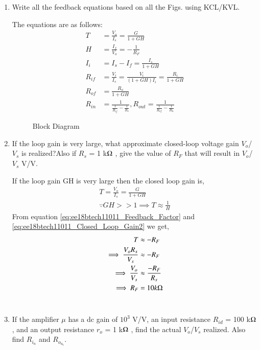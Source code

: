 \begin{enumerate}[label=\thesection.\arabic*.,ref=\thesection.\theenumi]
\item Write all the feedback equations based on all the Figs. using KCL/KVL.

\solution The equations are as follows:
%
\begin{align}
\label{eq:ee18btech11011_Closed_loop_Gain1}
T &= \frac{V_{o}}{I_{s}} = \frac{G}{1+GH}
\\
\label{eq:ee18btech11011_Feedback_Factor}
H &= \frac{I_{f}}{V_{o}} = -\frac{1}{R_F}
\\
\label{eq:ee18btech11011_I_i}
I_{i} &= I_{s} - I_{f} = \frac{I_{s}}{1+GH}
\\
\label{eq:ee18btech11011_R_if}
R_{i f} &= \frac{V_{i}}{I_{s}} = \frac{V_{i}}{(1+GH)I_{i}} =\frac{R_{i}}{1+GH}
\\
\label{eq:ee18btech11011_R_of}
R_{o f} &= \frac{R_{o}}{1+GH}
\\
\label{eq:ee18btech11011_R_in_and_R_out}
R_{i n} &= \frac{1}{\frac{1}{R_{i f}} - \frac{1}{R_{s}}} , R_{o u t} = \frac{1}{\frac{1}{R_{o f}} - \frac{1}{R_{L}}}
\end{align}
%

\begin{table}[!ht]
\centering

\caption{}
\label{table: Parameters_Table}
\end{table}

\begin{figure}[!ht]
	\begin{center}
			\resizebox{\columnwidth}{!}{}
	\end{center}
\caption{Block Diagram}
\label{fig:Block Diagram}
\end{figure}

\item If the loop gain is very large, what approximate closed-loop voltage gain $V_o$/$V_s$ is realized?Also if $R_s$ = 1 k$\ohm$ , give the value of $R_F$ that will result in $V_o$/$V_s$  V/V.

\solution If the loop gain GH is very large then the closed loop gain is,
%
\begin{align}
T = \frac{V_{o}}{I_{s}} = \frac{G}{1+GH}
\\
\because GH >> 1 \implies T \approx \frac{1}{H}
\label{eq:ee18btech11011_Closed_Loop_Gain2}
\end{align}
%
From equation \ref{eq:ee18btech11011_Feedback_Factor} and \ref{eq:ee18btech11011_Closed_Loop_Gain2} we get,
%
\begin{align}
T &\approx -R_{F}
\\
\implies \frac{V_{o}R_s}{V_{s}} &\approx -R_{F}
\\
\implies \frac{V_{o}}{V_{s}} &\approx \frac{-R_{F}}{R_{s}}
\\
\implies R_F &= 10k\ohm
\end{align}
%
\\
\item If the amplifier $\mu$ has a dc gain of $10^3$ V/V, an input resistance $R_{i d}$ = 100 k$\ohm$ , and an output resistance $r_o$ = 1 k$\ohm$ , find the actual $V_o$/$V_s$ realized. Also find $R_i_n$ and $R_o_u_t$.


\end{enumerate}
